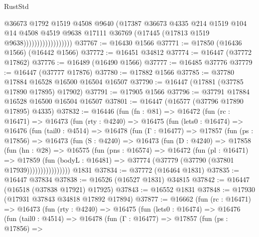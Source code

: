 \begin{lexlean}{RustStd}
\begin{coremodule}
{\begin{coremodule}
{{{{{{{{{{{{{{{{{{{{{{{{{{{{{{{{{{{{{{{{{{{{{{{{{{{{{{{                                  @36673
                                  @1792
                                  @1519
                                  @4508
                                  @9640
                                  (@17387
                                    @36673
                                    @4335
                                    @214
                                    @1519
                                    @104
                                    @14
                                    @4508
                                    @4519
                                    @9638
                                    @17111
                                    @36769
                                    (@17445 (@17813 @1519 @9638))))))))))))))))))
@37767 := @16430 @1566
@37771 := @17850 (@16436 @1566) (@16442 @1566)
@37772 := @16451 @34812
@37774 := @16447 (@37772 @17862)
@37776 := @16489 (@16490 @1566)
@37777 := @16485 @37776
@37779 := @16447 (@37777 @17876)
@37780 := @17882 @1566
@37785 := @37780 @17884 @16528 @16500 @16504 @16507
@37790 := @16447 (@17881 (@37785 @17890 @17895) @17902)
@37791 := @17905 @1566
@37796 := @37791 @17884 @16528 @16500 @16504 @16507
@37801 := @16447 (@16577 (@37796 @17890 @17895) @4335)
@37832 := @16446
    (fun (fn : @81) =>
    @16472
      (fun (rc : @16471) =>
      @16473
        (fun (rty : @4240) =>
        @16475
          (fun (lets0 : @16474) =>
          @16476
            (fun (tail0 : @4514) =>
            @16478
              (fun (Γ : @16477) =>
              @17857
                (fun (ps : @17856) =>
                @16473
                  (fun (S : @4240) =>
                  @16473
                    (fun (D : @4240) =>
                    @17858
                      (fun (hn : @28) =>
                      @16575
                        (fun (pns : @16574) =>
                        @16472
                          (fun (pl : @16471) =>
                          @17859
                            (fun (bodyL : @16481) =>
                            @37774 (@37779 (@37790 (@37801 @17939))))))))))))))))
    @1831
@37834 := @37772 (@16464 @1831)
@37835 := @16447 @37834
@37838 := @16526 (@16527 @1831) @34815
@37842 := @16447 (@16518 (@37838 @17921) @17925)
@37843 := @16552 @1831
@37848 := @17930 (@17931 @37843 @34818 @17892 @17894)
@37877 := @16662
    (fun (rc : @16471) =>
    @16473
      (fun (rty : @4240) =>
      @16475
        (fun (lets0 : @16474) =>
        @16476
          (fun (tail0 : @4514) =>
          @16478
            (fun (Γ : @16477) =>
            @17857
              (fun (ps : @17856) =>
}}}}}}}}}}}}}}}}}}}}}}}}}}}}}}}}}}}}}}}}}}}}}}}}}}}}}}}
\end{coremodule}}
\end{coremodule}
\end{lexlean}

